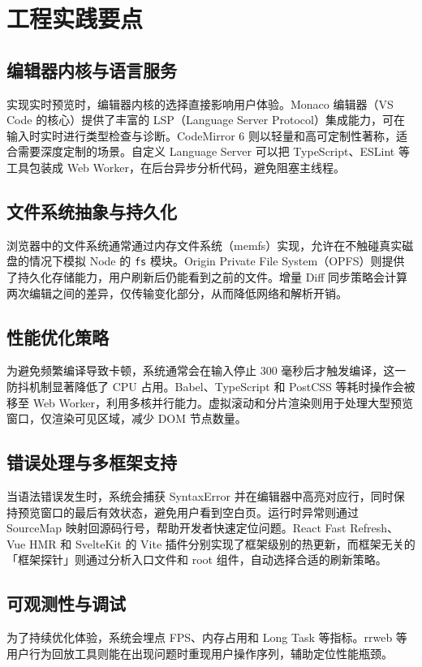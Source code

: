\chapter{工程实践要点}
\section{编辑器内核与语言服务}
实现实时预览时，编辑器内核的选择直接影响用户体验。Monaco 编辑器（VS Code 的核心）提供了丰富的 LSP（Language Server Protocol）集成能力，可在输入时实时进行类型检查与诊断。CodeMirror 6 则以轻量和高可定制性著称，适合需要深度定制的场景。自定义 Language Server 可以把 TypeScript、ESLint 等工具包装成 Web Worker，在后台异步分析代码，避免阻塞主线程。\par
\section{文件系统抽象与持久化}
浏览器中的文件系统通常通过内存文件系统（memfs）实现，允许在不触碰真实磁盘的情况下模拟 Node 的 \texttt{fs} 模块。Origin Private File System（OPFS）则提供了持久化存储能力，用户刷新后仍能看到之前的文件。增量 Diff 同步策略会计算两次编辑之间的差异，仅传输变化部分，从而降低网络和解析开销。\par
\section{性能优化策略}
为避免频繁编译导致卡顿，系统通常会在输入停止 300 毫秒后才触发编译，这一防抖机制显著降低了 CPU 占用。Babel、TypeScript 和 PostCSS 等耗时操作会被移至 Web Worker，利用多核并行能力。虚拟滚动和分片渲染则用于处理大型预览窗口，仅渲染可见区域，减少 DOM 节点数量。\par
\section{错误处理与多框架支持}
当语法错误发生时，系统会捕获 SyntaxError 并在编辑器中高亮对应行，同时保持预览窗口的最后有效状态，避免用户看到空白页。运行时异常则通过 SourceMap 映射回源码行号，帮助开发者快速定位问题。React Fast Refresh、Vue HMR 和 SvelteKit 的 Vite 插件分别实现了框架级别的热更新，而框架无关的「框架探针」则通过分析入口文件和 root 组件，自动选择合适的刷新策略。\par
\section{可观测性与调试}
为了持续优化体验，系统会埋点 FPS、内存占用和 Long Task 等指标。rrweb 等用户行为回放工具则能在出现问题时重现用户操作序列，辅助定位性能瓶颈。\par
